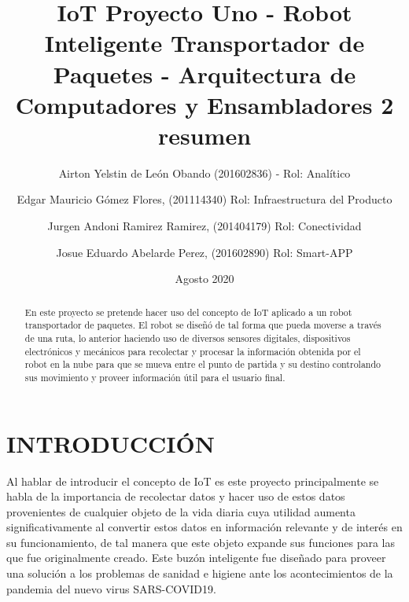 \documentclass[osajnl,twocolumn,showpacs,superscriptaddress,10pt]{revtex4-1}
\begin{document}

\title{\Huge IoT Proyecto Uno -  Robot Inteligente Transportador de Paquetes  - Arquitectura de Computadores y Ensambladores 2 }

\author{\newline Airton Yelstin de León Obando (201602836) - Rol: Analítico}
%

\author{\newline Edgar Mauricio Gómez Flores, (201114340) Rol: Infraestructura del Producto}%
%
\author{\newline Jurgen Andoni Ramirez Ramirez, (201404179) Rol: Conectividad}%
%
\author{\newline Josue Eduardo Abelarde Perez, (201602890) Rol: Smart-APP}%
%
\date{Agosto 2020}



\begin{abstract}
\title {resumen}
En este proyecto se pretende hacer uso del concepto de IoT aplicado a un robot transportador de paquetes. El robot se diseñó de tal forma que pueda moverse a través de una ruta, lo anterior haciendo uso de diversos sensores digitales, dispositivos electrónicos y mecánicos para recolectar y procesar la información obtenida por el robot en la nube para que se mueva entre el punto de partida y su destino controlando sus movimiento y proveer información útil para el usuario final.
\end{abstract}
\maketitle{}
\section{INTRODUCCIÓN}
Al hablar de introducir el concepto de IoT es este proyecto principalmente se habla de la importancia de recolectar datos y hacer uso de estos datos provenientes de cualquier objeto de la vida diaria cuya utilidad aumenta significativamente al convertir estos datos en información relevante y de interés en su funcionamiento, de tal manera que este objeto expande sus funciones para las que fue originalmente creado. Este buzón inteligente fue diseñado para proveer una solución a los problemas de sanidad e higiene ante los acontecimientos de la pandemia del nuevo virus SARS-COVID19.
\end{document}
